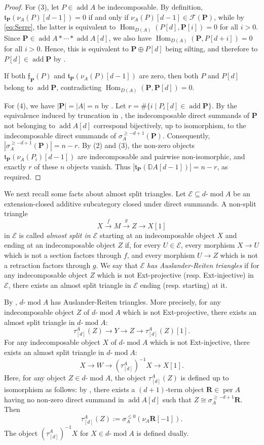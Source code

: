 \documentclass[11pt,a4paper,reqno]{amsart}
\theoremstyle{plain}
\numberwithin{equation}{section}
\theoremstyle{definition}
\providecommand{\add}{\operatorname{add}}
\providecommand{\per}{\operatorname{per}}
\renewcommand{\mod}{\operatorname{mod}}
\newcommand{\Hom}{\operatorname{Hom}}
\newcommand{\emod}[2]{#1\text{-}\!\mod #2}
\newcommand{\PP}{\mathbf{P}}
\newcommand{\RR}{\mathbf{R}}
\newcommand{\F}{\mathcal{F}}
\begin{document}
\begin{proof}
For (3), let $P\in\add A$ be indecomposable. By definition, $\mathfrak{t}_{\PP}(\nu_A(P)[d-1])=0$ if and only if $\nu_A(P)[d-1]\in\F(\PP)$, while by \eqref{eq:Serre}, the latter is equivalent to $\Hom_{D(A)}(P[d],\PP[i])=0$ for all $i>0$. Since $\PP\in\add A*\cdots*\add A[d]$, we also have $\Hom_{D(A)}(\PP,P[d+i])=0$ for all $i>0$.
Hence, this is equivalent to $\PP\oplus P[d]$ being silting, and therefore to
$P[d]\in\add\PP$ by \cite[Theorem~2.18]{AI}. 

If both $\mathfrak{f}_{\PP}(P)$ and $\mathfrak{t}_{\PP}(\nu_A(P)[d-1])$ are zero, then both $P$ and $P[d]$ belong to $\add\PP$, contradicting $\Hom_{D(A)}(\PP,\PP[d])=0$.

For (4), we have $|\PP|=|A|=n$ by
\cite[Corollary~2.28]{AI}. Let $r=\#\{i\mid P_i[d]\in\add\PP\}$.  By the equivalence induced by truncation in \cite[Theorem~2.5]{MP}, the indecomposable direct summands of $\PP$ not belonging to $\add A[d]$ correspond bijectively, up to isomorphism, to the indecomposable direct summands of $\sigma_A^{\geq-d+1}(\PP)$. Consequently, $|\sigma_A^{\geq-d+1}(\PP)|=n-r$. By (2) and (3), the non-zero objects $\mathfrak{t}_{\PP}(\nu_A(P_i)[d-1])$ are indecomposable and pairwise non-isomorphic, and exactly $r$ of these $n$ objects vanish. Thus $|\mathfrak{t}_{\PP}(\mathbb D A[d-1])|=n-r$, as required.
\end{proof}

We next recall some facts about almost split triangles. Let $\mathcal{E}\subseteq\emod{d}{A}$ be an extension-closed additive subcategory closed under direct summands. A non-split triangle
\[
 X\xrightarrow{f}M\xrightarrow{g}Z\to X[1]
\]
in $\mathcal{E}$ is called \emph{almost split in $\mathcal{E}$} starting at an indecomposable object $X$ and ending at an indecomposable object $Z$ if, for every $U\in\mathcal{E}$, every morphism $X\to U$ which is not a section factors through $f$, and every morphism $U\to Z$ which is not a retraction factors through $g$. We say that $\mathcal{E}$ \emph{has Auslander-Reiten triangles} if for any indecomposable object $Z$ which is not Ext-projective (resp. Ext-injective) in $\mathcal{E}$, there exists an almost split triangle in $\mathcal{E}$ ending (resp. starting) at it.

By \cite[Theorem~1.2 and Corollary~1.3]{MP}, $\emod{d}{A}$ has Auslander-Reiten triangles. More precisely, for any indecomposable object $Z$ of $\emod{d}{A}$ which is not Ext-projective, there exists an almost split triangle in $\emod{d}{A}$:
\[\tau^A_{[d]}(Z)\to Y\to Z\to \tau^A_{[d]}(Z)[1].\]
For any indecomposable object $X$ of $\emod{d}{A}$ which is not Ext-injective, there exists an almost split triangle in $\emod{d}{A}$:
\[X\to W\to (\tau^A_{[d]})^{-1}X \to X[1].\]
Here, for any object $Z\in\emod{d}{A}$, the object $\tau^A_{[d]}(Z)$ is defined up to isomorphism as follows: by \cite[Theorem~2.5]{MP}, there exists a $(d+1)$-term object $\RR\in\per A$ having no non-zero direct summand in $\add A[d]$ such that $Z\cong\sigma_A^{\geq -d+1}\RR$. Then
\begin{equation}\label{eq:ARd}
    \tau^A_{[d]}(Z):=\sigma_A^{\leq 0}(\nu_A\RR[-1]).
\end{equation}
The object $(\tau^A_{[d]})^{-1}X$ for $X\in\emod{d}{A}$ is defined dually.
\end{document}
